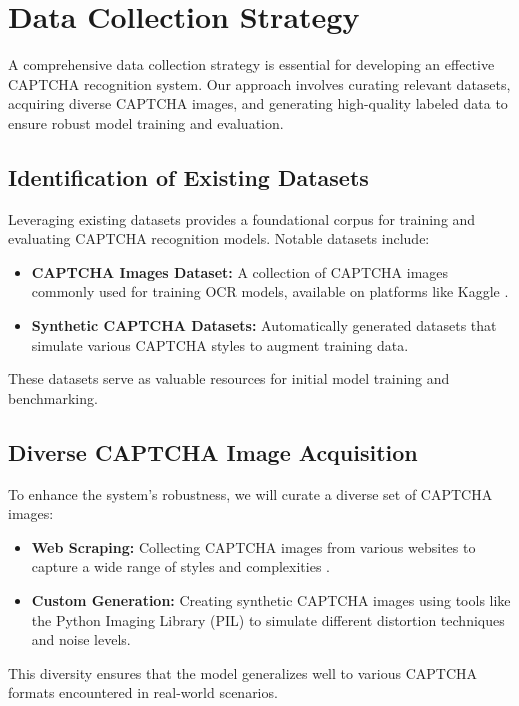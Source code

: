 \documentclass[sigconf]{acmart}
\begin{document}
\section{Data Collection Strategy}

A comprehensive data collection strategy is essential for developing an effective CAPTCHA recognition system. Our approach involves curating relevant datasets, acquiring diverse CAPTCHA images, and generating high-quality labeled data to ensure robust model training and evaluation.

\subsection{Identification of Existing Datasets}

Leveraging existing datasets provides a foundational corpus for training and evaluating CAPTCHA recognition models. Notable datasets include:

\begin{itemize} \item \textbf{CAPTCHA Images Dataset:} A collection of CAPTCHA images commonly used for training OCR models, available on platforms like Kaggle \cite{turn0search3}. \item \textbf{Synthetic CAPTCHA Datasets:} Automatically generated datasets that simulate various CAPTCHA styles to augment training data. \end{itemize}

These datasets serve as valuable resources for initial model training and benchmarking.

\subsection{Diverse CAPTCHA Image Acquisition}

To enhance the system's robustness, we will curate a diverse set of CAPTCHA images:

\begin{itemize} \item \textbf{Web Scraping:} Collecting CAPTCHA images from various websites to capture a wide range of styles and complexities \cite{turn0search6}. \item \textbf{Custom Generation:} Creating synthetic CAPTCHA images using tools like the Python Imaging Library (PIL) to simulate different distortion techniques and noise levels. \end{itemize}

This diversity ensures that the model generalizes well to various CAPTCHA formats encountered in real-world scenarios.
\end{document}

